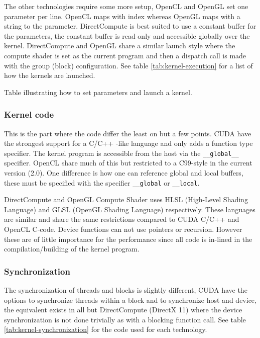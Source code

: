 The other technologies require some more setup, OpenCL and OpenGL set one parameter per line. OpenCL maps with index whereas OpenGL maps with a string to the parameter. DirectCompute is best suited to use a constant buffer for the parameters, the constant buffer is read only and accessible globally over the kernel. DirectCompute and OpenGL share a similar launch style where the compute shader is set as the current program and then a dispatch call is made with the group (block) configuration. See table \ref{tab:kernel-execution} for a list of how the kernels are launched.

\begin{table}[h!]
	\centering
	
	\caption{Table illustrating how to set parameters and launch a kernel.}
	\label{tab:kernel-execution}
\end{table}

\subsubsection{Kernel code}

This is the part where the code differ the least on but a few points. CUDA have the strongest support for a C/C++ -like language and only adds a function type specifier. The kernel program is accessible from the host via the \texttt{\_\_global\_\_} specifier. OpenCL share much of this but restricted to a C99-style in the current version (2.0). One difference is how one can reference global and local buffers, these must be specified with the specifier \texttt{\_\_global} or \texttt{\_\_local}.

DirectCompute and OpenGL Compute Shader uses HLSL (High-Level Shading Language) and GLSL (OpenGL Shading Language) respectively. These languages are similar and share the same restrictions compared to CUDA C/C++ and OpenCL C-code. Device functions can not use pointers or recursion. However these are of little importance for the performance since all code is in-lined in the compilation/building of the kernel program.

\subsubsection{Synchronization}

The synchronization of threads and blocks is slightly different, CUDA have the options to synchronize threads within a block and to synchronize host and device, the equivalent exists in all but DirectCompute (DirectX 11) where the device synchronization is not done trivially as with a blocking function call. See table \ref{tab:kernel-synchronization} for the code used for each technology.

